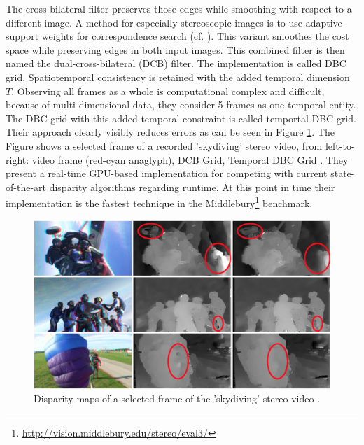 The cross-bilateral filter preserves those edges while smoothing with respect to a different image.
A method for especially stereoscopic images is to use adaptive support weights for correspondence search (cf. \citep{yoon2006adaptive}).
This variant smoothes the cost space while preserving edges in both input images.
This combined filter is then named the dual-cross-bilateral (DCB) filter.
The implementation is called DBC grid.
Spatiotemporal consistency is retained with the added temporal dimension $T$.
Observing all frames as a whole is computational complex and difficult, because of multi-dimensional data, they consider 5 frames as one temporal entity.
The DBC grid with this added temporal constraint is called temportal DBC grid.
Their approach clearly visibly reduces errors as can be seen in Figure \ref{fig:dbcgrid}.
The Figure shows a selected frame of a recorded 'skydiving' stereo video, from left-to-right: video frame (red-cyan anaglyph), DCB Grid, Temporal DBC Grid \citep{richardt2010real}.
\newline\newline\noindent They present a real-time GPU-based implementation for competing with current state-of-the-art disparity algorithms regarding runtime.
At this point in time their implementation is the fastest technique in the Middlebury\footnote{\url{http://vision.middlebury.edu/stereo/eval3/}} benchmark.

\begin{figure}[h!]
  \centering
  \includegraphics[width=1.0\textwidth]{src/images/dbcgrid.png}
  \caption[Disparity maps of a selected frame of the 'skydiving' stereo video]{Disparity maps of a selected frame of the 'skydiving' stereo video \citep{richardt2010real}.}
  \label{fig:dbcgrid}
\end{figure}


